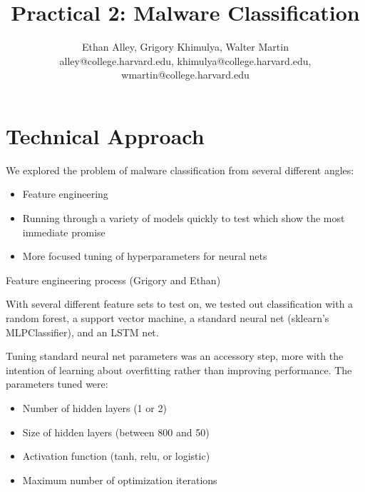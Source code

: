\documentclass[11pt]{article}
\title{Practical 2: Malware Classification}
\author{Ethan Alley, Grigory Khimulya, Walter Martin \\ alley@college.harvard.edu, khimulya@college.harvard.edu, wmartin@college.harvard.edu }
\begin{document}
\maketitle{}

\section{Technical Approach}

We explored the problem of malware classification from several different angles:

\begin{itemize}
	\item Feature engineering
	\item Running through a variety of models quickly to test which show the most immediate promise
	\item More focused tuning of hyperparameters for neural nets
\end{itemize}

\noindent Feature engineering process (Grigory and Ethan)
\linebreak

\noindent With several different feature sets to test on, we tested out classification with a random forest, a support vector machine, a standard neural net (sklearn's MLPClassifier), and an LSTM net.
\linebreak

\noindent Tuning standard neural net parameters was an accessory step, more with the intention of learning about overfitting rather than improving performance. The parameters tuned were:
	
	\begin{itemize}
		\item Number of hidden layers (1 or 2)
		\item Size of hidden layers (between 800 and 50)
		\item Activation function (tanh, relu, or logistic)
		\item Maximum number of optimization iterations
	\end{itemize}

\pagebreak
\end{document}
